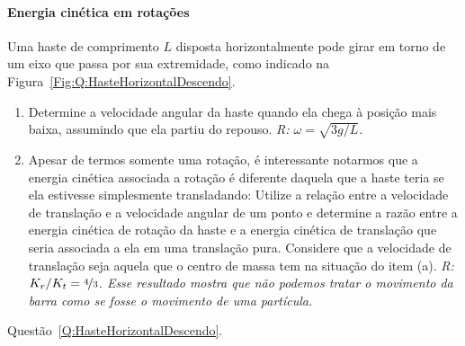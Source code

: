 \paragraph{Energia cinética em rotações}

\begin{question}[type={exam}]\label{Q:HasteHorizontalDescendo}
Uma haste de comprimento $L$ disposta horizontalmente pode girar em torno de um eixo que passa por sua extremidade, como indicado na Figura~\ref{Fig:Q:HasteHorizontalDescendo}.
\begin{enumerate}[label=(\alph*)]
    \item Determine a velocidade angular da haste quando ela chega à posição mais baixa, assumindo que ela partiu do repouso. {\it R: $\omega = \sqrt{3g/L}$.}
    \item Apesar de termos somente uma rotação, é interessante notarmos que a energia cinética associada a rotação é diferente daquela que a haste teria se ela estivesse simplesmente transladando: Utilize a relação entre a velocidade de translação e a velocidade angular de um ponto e determine a razão entre a energia cinética de rotação da haste e a energia cinética de translação que seria associada a ela em uma translação pura. Considere que a velocidade de translação seja aquela que o centro de massa tem na situação do item (a). {\it R: $K_r/K_t = \nicefrac{4}{3}$. Esse resultado mostra que não podemos tratar o movimento da barra como se fosse o movimento de uma partícula.}
\end{enumerate}
\end{question}

\begin{marginfigure}
\centering
{}
\caption{Questão~\ref{Q:HasteHorizontalDescendo}. \label{Fig:Q:HasteHorizontalDescendo}}
\end{marginfigure}



